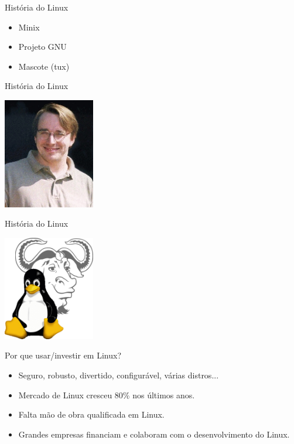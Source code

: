 \documentclass{beamer}
\begin{document}
\begin{frame}{Hist\'oria do Linux}
\begin{itemize}
  \item Minix
  \item Projeto GNU
  \item Mascote (tux)
\end{itemize}
 
\end{frame}

\begin{frame}{Hist\'oria do Linux}
\begin{center}
 
\includegraphics[width=0.3\textwidth]{images/liunus.jpg}
\end{center}
\end{frame}

\begin{frame}{Hist\'oria do Linux}
 \begin{center}
  \includegraphics[width=0.3\textwidth]{images/Gnulinux.png}
 \end{center}


\end{frame}

\begin{frame}{Por que usar/investir em Linux?}
 
\begin{itemize}
 \item Seguro, robusto, divertido, configur\'avel, v\'arias distros...
 \item Mercado de Linux cresceu 80\% nos \'ultimos anos.
 \item Falta m\~ao de obra qualificada em Linux.
 \item Grandes empresas financiam e colaboram com o desenvolvimento do Linux.
\end{itemize}

\end{frame}
\end{document}
